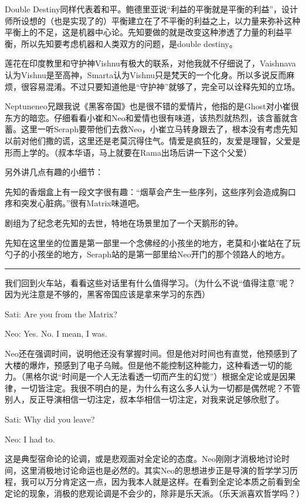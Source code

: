 \documentclass[UTF8]{ctexart}
\newcommand{\myparsep}{\noindent \rule[0.5ex]{\linewidth}{1pt}}
\newenvironment{myquote}{\color{green} \setlength{\leftskip}{6em} \setlength{\rightskip}{4em} \setlength{\parindent}{-2em}}{\par}
\begin{document}
Double Destiny同样代表着和平。鲍德里亚说“利益的平衡就是平衡的利益”，设计师所设想的（也是实现了的）平衡建立在了不平衡的利益之上，以力量来弥补这种平衡上的不足，这是机器中心论。先知要做的就是改变这种渗透了力量的利益平衡，所以先知要考虑机器和人类双方的问题，是double destiny。

莲花在印度教里和守护神Vishnu有极大的联系，对他我就不仔细说了，Vaishnava认为Vishnu是至高神，Smarta认为Vishnu只是梵天的一个化身。所以多说反而麻烦，很容易混淆。不过只要知道他是“守护神”就够了，完全可以诠释先知的立场。

Neptuneneo兄跟我说《黑客帝国》也是很不错的爱情片，他指的是Ghost对小崔很东方的暗恋。仔细看看小崔和Neo和爱情也很有味道，该热烈就热烈，该含蓄就含蓄。这里一听Seraph要带他们去救Neo，小崔立马转身跟去了，根本没有考虑先知以前对他们撒的谎，这里还是老莫沉得住气。情爱是疯狂的，友爱是理智，父爱是形而上学的。（叔本华语，马上就要在Rama出场后讲一下这个父爱）

另外讲几点有趣的小细节：

先知的香烟盒上有一段文字很有趣：“烟草会产生一些序列，这些序列会造成胸口疼和突发心脏病。”很有Matrix味道吧。

剧组为了纪念老先知的去世，特地在场景里加了一个天鹅形的钟。

先知在这里坐的位置是第一部里一个念佛经的小孩坐的地方，老莫和小崔站在了玩勺子的小孩坐的地方，Seraph站的是第一部里给Neo开门的那个领路人的地方。

\myparsep

我们回到火车站，看看这些对话里有什么值得学习。（为什么不说“值得注意”呢？因为光注意是不够的，黑客帝国应该是拿来学习的东西）

\begin{myquote}
Sati: Are you from the Matrix?

Neo: Yes. No. I mean, I was.
\end{myquote}

Neo还在强调时间，说明他还没有掌握时间。但是他对时间也有直觉，他预感到了大楼的爆炸，预感到了电子乌贼。但是他不能控制这种能力，这种看透一切的能力。（黑格尔说“时间是一个人无法看透一切而产生的幻觉”）根据全定论或是因果律，一切皆注定。我很不明白的是，为什么有这么多人认为一切都是偶然呢？不管别人，反正导演相信一切注定，叔本华相信一切注定，对我来说足够欣慰了。

\begin{myquote}
Sati: Why did you leave?

Neo: I had to.
\end{myquote}

这是典型宿命论的论调，或是悲观面对全定论的态度。Neo刚刚才消极地讨论时间，这里消极地讨论命运也是必然的。其实Neo的思想进步正是导演的哲学学习历程，我可以万分肯定这一点，因为我本人就是这样。在看到全定论本质之前看到全定论的现象，消极的悲观论调是不会少的，除非是乐天派。（乐天派喜欢哲学吗？）
\end{document}
